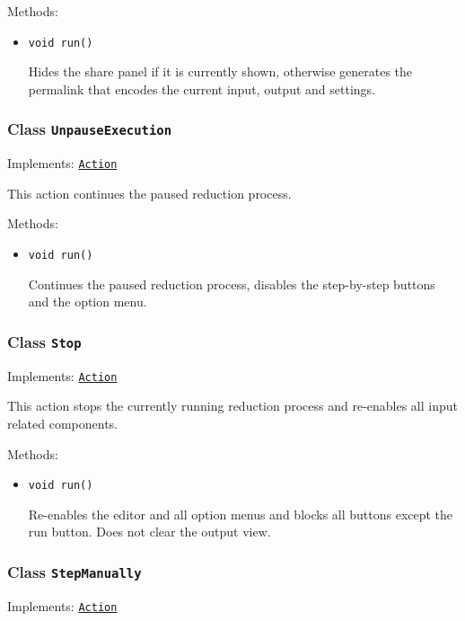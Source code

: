 Methods:
\begin{itemize}
\item \texttt{void run()}

Hides the share panel if it is currently shown, otherwise generates the
 permalink that encodes the current input, output and settings.

\end{itemize}

\subsubsection{Class \texttt{UnpauseExecution}}
\label{type:edu.kit.wavelength.client.view.action.UnpauseExecution}
Implements: \texttt{\hyperref[type:edu.kit.wavelength.client.view.action.Action]{Action}}

This action continues the paused reduction process.

Methods:
\begin{itemize}
\item \texttt{void run()}

Continues the paused reduction process, disables the step-by-step buttons and
 the option menu.

\end{itemize}

\subsubsection{Class \texttt{Stop}}
\label{type:edu.kit.wavelength.client.view.action.Stop}
Implements: \texttt{\hyperref[type:edu.kit.wavelength.client.view.action.Action]{Action}}

This action stops the currently running reduction process and re-enables all
 input related components.

Methods:
\begin{itemize}
\item \texttt{void run()}

Re-enables the editor and all option menus and blocks all buttons except the
 run button. Does not clear the output view.

\end{itemize}

\subsubsection{Class \texttt{StepManually}}
\label{type:edu.kit.wavelength.client.view.action.StepManually}
Implements: \texttt{\hyperref[type:edu.kit.wavelength.client.view.action.Action]{Action}}

